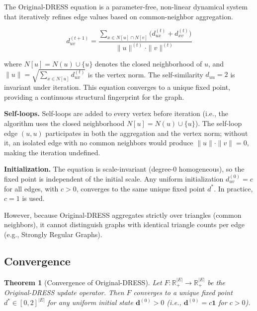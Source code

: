\documentclass[11pt,a4paper]{article}
\newtheorem{theorem}{Theorem}
\begin{document}
The Original-DRESS equation \cite{castrillo2018dynamicstructuralsimilaritygraphs} is a parameter-free, non-linear dynamical system that iteratively refines edge values based on common-neighbor aggregation.

\begin{equation}
d_{uv}^{(t+1)} = \frac{\sum_{x \in N[u] \cap N[v]} \bigl(d_{ux}^{(t)} + d_{xv}^{(t)}\bigr)}{\|u\|^{(t)} \cdot \|v\|^{(t)}}
\end{equation}

where $N[u] = N(u) \cup \{u\}$ denotes the closed neighborhood of $u$, and $\|u\| = \sqrt{\sum_{x \in N[u]} d_{ux}^{(t)}}$ is the vertex norm. The self-similarity $d_{uu} = 2$ is invariant under iteration. This equation converges to a unique fixed point, providing a continuous structural fingerprint for the graph.

\textbf{Self-loops.} Self-loops are added to every vertex before iteration (i.e., the algorithm uses the closed neighborhood $N[u] = N(u) \cup \{u\}$). The self-loop edge $(u,u)$ participates in both the aggregation and the vertex norm; without it, an isolated edge with no common neighbors would produce $\|u\| \cdot \|v\| = 0$, making the iteration undefined.

\textbf{Initialization.} The equation is scale-invariant (degree-0 homogeneous), so the fixed point is independent of the initial scale. Any uniform initialization $d^{(0)}_{uv} = c$ for all edges, with $c > 0$, converges to the same unique fixed point $d^*$. In practice, $c = 1$ is used.

However, because Original-DRESS aggregates strictly over triangles (common neighbors), it cannot distinguish graphs with identical triangle counts per edge (e.g., Strongly Regular Graphs).

\subsection{Convergence}
\label{sec:convergence}

\begin{theorem}[Convergence of Original-DRESS]
\label{thm:convergence}
Let $F\colon \mathbb{R}_+^{|E|} \to \mathbb{R}_+^{|E|}$ be the Original-DRESS update operator. Then $F$ converges to a unique fixed point $d^* \in [0, 2]^{|E|}$ for any uniform initial state $\mathbf{d}^{(0)} > 0$ (i.e., $\mathbf{d}^{(0)} = c\mathbf{1}$ for $c > 0$).
\end{theorem}
\end{document}
